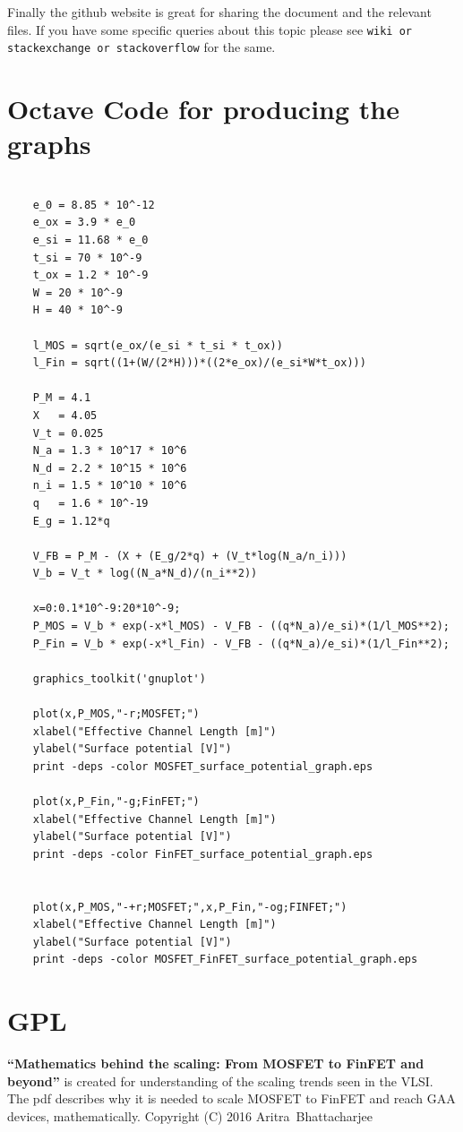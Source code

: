 \documentclass[a4paper]{article}
\begin{document}
\begin{appendices}
  Finally the github website is great for sharing the document and the relevant files. If you have some specific queries about this topic please see \texttt{wiki or stackexchange or stackoverflow} for the same.

  \section{Octave Code for producing the graphs}
  \begin{lstlisting}

    e_0 = 8.85 * 10^-12
    e_ox = 3.9 * e_0
    e_si = 11.68 * e_0
    t_si = 70 * 10^-9
    t_ox = 1.2 * 10^-9
    W = 20 * 10^-9
    H = 40 * 10^-9

    l_MOS = sqrt(e_ox/(e_si * t_si * t_ox))
    l_Fin = sqrt((1+(W/(2*H)))*((2*e_ox)/(e_si*W*t_ox)))

    P_M = 4.1
    X   = 4.05
    V_t = 0.025
    N_a = 1.3 * 10^17 * 10^6
    N_d = 2.2 * 10^15 * 10^6
    n_i = 1.5 * 10^10 * 10^6
    q   = 1.6 * 10^-19
    E_g = 1.12*q

    V_FB = P_M - (X + (E_g/2*q) + (V_t*log(N_a/n_i)))
    V_b = V_t * log((N_a*N_d)/(n_i**2))

    x=0:0.1*10^-9:20*10^-9;
    P_MOS = V_b * exp(-x*l_MOS) - V_FB - ((q*N_a)/e_si)*(1/l_MOS**2);
    P_Fin = V_b * exp(-x*l_Fin) - V_FB - ((q*N_a)/e_si)*(1/l_Fin**2);

    graphics_toolkit('gnuplot')

    plot(x,P_MOS,"-r;MOSFET;")
    xlabel("Effective Channel Length [m]")
    ylabel("Surface potential [V]")
    print -deps -color MOSFET_surface_potential_graph.eps

    plot(x,P_Fin,"-g;FinFET;")
    xlabel("Effective Channel Length [m]")
    ylabel("Surface potential [V]")
    print -deps -color FinFET_surface_potential_graph.eps


    plot(x,P_MOS,"-+r;MOSFET;",x,P_Fin,"-og;FINFET;")
    xlabel("Effective Channel Length [m]")
    ylabel("Surface potential [V]")
    print -deps -color MOSFET_FinFET_surface_potential_graph.eps

  \end{lstlisting}

  \section{GPL}

  \textbf{``Mathematics behind the scaling: From MOSFET to FinFET and beyond''} is created for understanding of the scaling trends seen in the VLSI. The pdf describes why it is needed to scale MOSFET to FinFET and reach GAA devices, mathematically.
  Copyright (C) 2016 Aritra~Bhattacharjee


\end{appendices}
\end{document}
